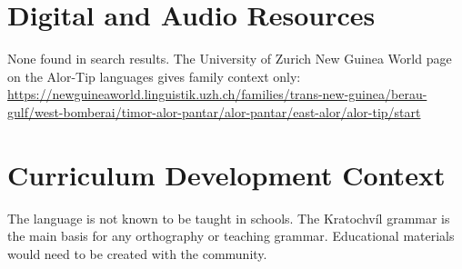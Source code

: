 \documentclass[12pt]{article}
\begin{document}
\section{Digital and Audio Resources}
None found in search results. The University of Zurich New Guinea World page on the Alor-Tip languages gives family context only: \url{https://newguineaworld.linguistik.uzh.ch/families/trans-new-guinea/berau-gulf/west-bomberai/timor-alor-pantar/alor-pantar/east-alor/alor-tip/start}

\section{Curriculum Development Context}
The language is not known to be taught in schools. The Kratochv\'il grammar is the main basis for any orthography or teaching grammar. Educational materials would need to be created with the community.
\end{document}
